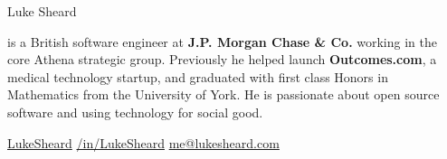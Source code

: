 {\Huge
  Luke Sheard
}

{\vspace{10pt}
  is a British software engineer at \textbf{J.P. Morgan Chase \& Co.} working in the core Athena strategic group. 
  Previously he helped launch \textbf{Outcomes.com}, a medical technology startup, 
  and graduated with first class Honors in Mathematics from the University of York.
  He is passionate about open source software and using technology for social good. 
}

\vspace{5pt}

\faGithub
\hspace{3pt}
\href{https://www.github.com/LukeSheard}{LukeSheard}
\hspace{20pt}
\faLinkedin
\hspace{3pt}
\href{http://www.linkedin.com/in/lukesheard}{/in/LukeSheard}
\hspace{20pt}
\faEnvelope
\hspace{3pt}
\href{mailto:me@lukesheard.com}{me@lukesheard.com}
